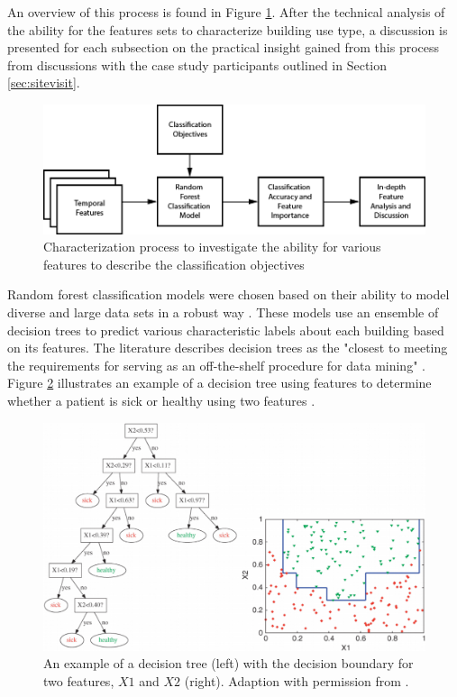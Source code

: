 An overview of this process is found in Figure \ref{fig:char_process}. After the technical analysis of the ability for the features sets to characterize building use type, a discussion is presented for each subsection on the practical insight gained from this process from discussions with the case study participants outlined in Section \ref{sec:sitevisit}.

\begin{figure}[ht!]
\begin{center}
\includegraphics[width=0.98\columnwidth]{figures/characterization_process/characterization_process}
\caption{{Characterization process to investigate the ability for various features to describe the classification objectives
\label{fig:char_process}%
}}
\end{center}
\end{figure}

Random forest classification models were chosen based on their ability to model diverse and large data sets in a robust way \cite{Breiman}. These models use an ensemble of decision trees to predict various characteristic labels about each building based on its features. The literature describes decision trees as the "closest to meeting the requirements for serving as an off-the-shelf procedure for data mining" \cite{hastie_elements_2009}. Figure \ref{fig:decisiontree} illustrates an example of a decision tree using features to determine whether a patient is sick or healthy using two features \cite{Geurts_2009}. 


\begin{figure}[ht!]
\begin{center}
\includegraphics[width=1\columnwidth]{figures/CART_tree_titanic_survivors/decision_tree}
\caption{{An example of a decision tree (left) with the decision boundary for two features, $X1$ and $X2$ (right). Adaption with permission from \cite{Geurts_2009}.
\label{fig:decisiontree}%
}}
\end{center}
\end{figure}

